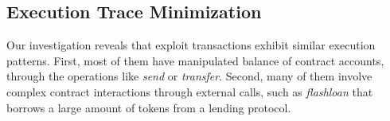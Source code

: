\subsection{Execution Trace Minimization}
Our investigation reveals that exploit transactions exhibit similar execution patterns. 
First, most of them have manipulated balance of contract accounts, through the operations like \emph{send} or \emph{transfer}.
Second, many of them involve complex contract interactions through external calls, such as \emph{flashloan} that borrows a large amount of tokens from a lending protocol.


